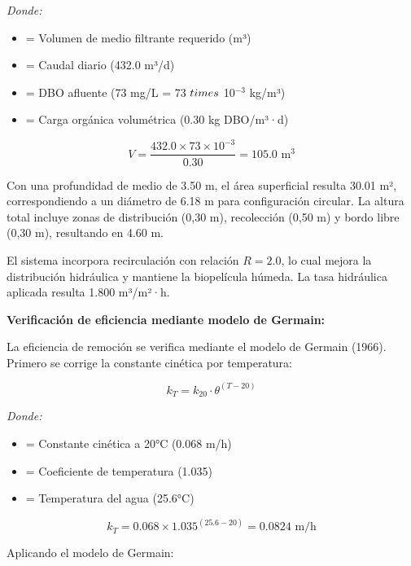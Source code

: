 \documentclass[12pt,a4paper]{article}
\begin{document}
\textit{Donde:}
\begin{itemize}[noitemsep,leftmargin=2em]
    \item[$V$] = Volumen de medio filtrante requerido (m³)
    \item[$Q$] = Caudal diario (432.0 m³/d)
    \item[$S_0$] = DBO afluente (73 mg/L = 73 $\\times$ 10$^{-3}$ kg/m³)
    \item[$C_v$] = Carga orgánica volumétrica (0.30 kg DBO/m³·d)
\end{itemize}

\begin{equation}
V = \frac{432.0 \times 73 \times 10^{-3}}{0.30} = 105.0 \text{ m}^3
\end{equation}

Con una profundidad de medio de 3.50 m, el área superficial resulta 30.01 m², correspondiendo a un diámetro de 6.18 m para configuración circular. La altura total incluye zonas de distribución (0,30 m), recolección (0,50 m) y bordo libre (0,30 m), resultando en 4.60 m.

El sistema incorpora recirculación con relación $R = 2.0$, lo cual mejora la distribución hidráulica y mantiene la biopelícula húmeda. La tasa hidráulica aplicada resulta 1.800 m³/m²·h.

\textbf{Verificación de eficiencia mediante modelo de Germain:}

La eficiencia de remoción se verifica mediante el modelo de Germain (1966). Primero se corrige la constante cinética por temperatura:

\begin{equation}
k_T = k_{20} \cdot \theta^{(T-20)}
\end{equation}

\textit{Donde:}
\begin{itemize}[noitemsep,leftmargin=2em]
    \item[$k_{20}$] = Constante cinética a 20°C (0.068 m/h)
    \item[$\theta$] = Coeficiente de temperatura (1.035)
    \item[$T$] = Temperatura del agua (25.6°C)
\end{itemize}

\begin{equation}
k_T = 0.068 \times 1.035^{(25.6-20)} = 0.0824 \text{ m/h}
\end{equation}

Aplicando el modelo de Germain:
\end{document}
